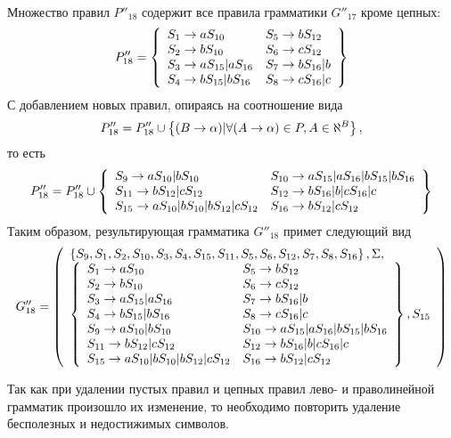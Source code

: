 \begin{itemize}
\begin{align*}
	      \end{align*}
	      Множество правил \(P''_{18}\) содержит все правила грамматики \(G''_{17}\) кроме цепных:
	      \begin{align*}
		      P''_{18} = \left\{
			      \begin{array}{ll}
				      S_1 \to aS_{10}         & S_5 \to bS_{12}   \\
				      S_2 \to bS_{10}         & S_6 \to cS_{12}   \\
				      S_3 \to aS_{15}|aS_{16} & S_7 \to bS_{16}|b \\
				      S_4 \to bS_{15}|bS_{16} & S_8 \to cS_{16}|c \\
			      \end{array}
		      \right\}
	      \end{align*}
	      С добавлением новых правил, опираясь на соотношение вида
	      \begin{align*}
		      P''_{18} = P''_{18} \cup \left\{(B \to \alpha) | \forall (A \to \alpha) \in P, A \in \aleph^B\right\},
	      \end{align*}
	      то есть
	      \begin{align*}
		      P''_{18} = P''_{18} \cup \left\{
			      \begin{array}{ll}
				      S_9 \to aS_{10}|bS_{10}                    & S_{10} \to aS_{15}|aS_{16}|bS_{15}|bS_{16} \\
				      S_{11} \to bS_{12}|cS_{12}                 & S_{12} \to bS_{16}|b|cS_{16}|c             \\
				      S_{15} \to aS_{10}|bS_{10}|bS_{12}|cS_{12} & S_{16} \to bS_{12}|cS_{12}
			      \end{array}
		      \right\}
	      \end{align*}
	      Таким образом, результирующая грамматика \(G''_{18}\) примет следующий вид
	      \begin{align*}
		      G''_{18} = \left( \begin{array}{l} \left\{S_9, S_1, S_2, S_{10}, S_3, S_4, S_{15}, S_{11}, S_5, S_6, S_{12}, S_7, S_8, S_{16}\right\}, \Sigma,\\\left\{\begin{array}{ll} 
		      S_1 \to aS_{10}                            & S_5 \to bS_{12}                            \\
		      S_2 \to bS_{10}                            & S_6 \to cS_{12}                            \\
		      S_3 \to aS_{15}|aS_{16}                    & S_7 \to bS_{16}|b                          \\
		      S_4 \to bS_{15}|bS_{16}                    & S_8 \to cS_{16}|c                          \\
		      S_9 \to aS_{10}|bS_{10}                    & S_{10} \to aS_{15}|aS_{16}|bS_{15}|bS_{16} \\
		      S_{11} \to bS_{12}|cS_{12}                 & S_{12} \to bS_{16}|b|cS_{16}|c             \\
		      S_{15} \to aS_{10}|bS_{10}|bS_{12}|cS_{12} & S_{16} \to bS_{12}|cS_{12}
		       \end{array}\right\}, S_{15} \end{array} \right)
	      \end{align*}
\end{itemize}
Так как при удалении пустых правил и цепных правил лево- и праволинейной грамматик произошло их изменение, то необходимо повторить удаление бесполезных и недостижимых символов.
